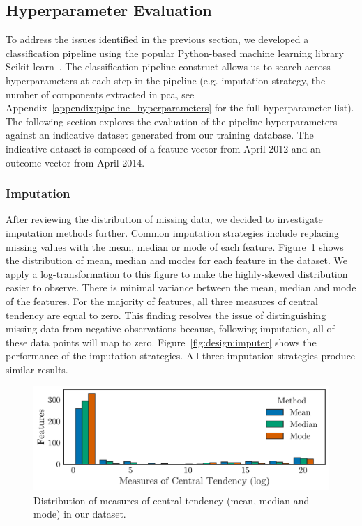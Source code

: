 \documentclass[../thesis/thesis.tex]{subfiles}
\begin{document}
\subsection{Hyperparameter Evaluation}

To address the issues identified in the previous section, we developed a classification pipeline using the popular Python-based machine learning library Scikit-learn~\cite{pedregosa2011}. The classification pipeline construct allows us to search across hyperparameters at each step in the pipeline (e.g. imputation strategy, the number of components extracted in \gls{pca}, see Appendix~\ref{appendix:pipeline_hyperparameters} for the full hyperparameter list). The following section explores the evaluation of the pipeline hyperparameters against an indicative dataset generated from our training database. The indicative dataset is composed of a feature vector from April 2012 and an outcome vector from April 2014.

\subsubsection{Imputation}

After reviewing the distribution of missing data, we decided to investigate imputation methods further. Common imputation strategies include replacing missing values with the mean, median or mode of each feature. Figure~\ref{fig:design:central_tendency} shows the distribution of mean, median and modes for each feature in the dataset. We apply a log-transformation to this figure to make the highly-skewed distribution easier to observe. There is minimal variance between the mean, median and mode of the features. For the majority of features, all three measures of central tendency are equal to zero. This finding resolves the issue of distinguishing missing data from negative observations because, following imputation, all of these data points will map to zero. Figure~\ref{fig:design:imputer} shows the performance of the imputation strategies. All three imputation strategies produce similar results.

\begin{figure}[!htb]
    \centering
    \includegraphics[width=\textwidth]{../figures/design/distribution_central_tendency}
    \caption[Distribution of central tendency]{Distribution of measures of central tendency (mean, median and mode) in our dataset.}
    \label{fig:design:central_tendency}
\end{figure}
\end{document}
